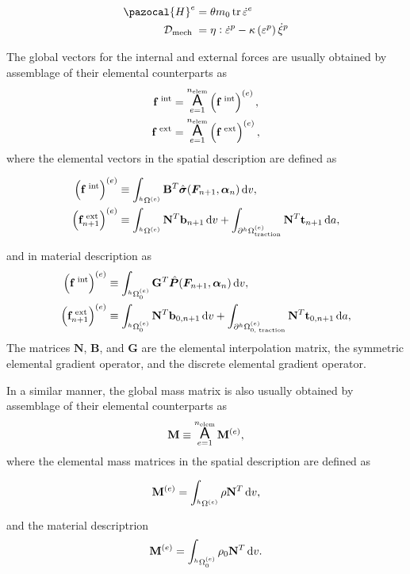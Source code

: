 \begin{equation}
\begin{aligned}
\pazocal{H}^{e} &=\theta m_{0} \operatorname{tr} \dot{\varepsilon}^{e} \\
\mathcal{D}_{\text {mech }} &=\eta: \dot{\varepsilon}^{p}-\kappa\left(\varepsilon^{p}\right) \dot{\xi}^{p}
\end{aligned}
\end{equation}


The global vectors for the internal and external forces are usually obtained by assemblage of their elemental counterparts as
\begin{gather}
    \mathbf f^\text{\;int} = \operatorname*{\text{\Large $ \mathsf{A} $}}_{e=1}^{n_\text{elem}} \left(\mathbf f^\text{\;int}\right)^{(e)},\\
    \mathbf f^\text{\;ext} = \operatorname*{\text{\Large $ \mathsf{A} $}}_{e=1}^{n_\text{elem}} \left(\mathbf f^\text{\;ext}\right)^{(e)},
\end{gather}
where the elemental vectors in the spatial description are defined as
\begin{highlight}[innertopmargin=-5pt]
    \begin{align}
        \left(\mathbf f^\text{\;int}\right)^{(e)} &\equiv \int_{^h\Omega^{(e)}} \mathbf B^T \hat{\bm{\sigma} }(\bm{F}_{n+1},\bm{\alpha}_n)\,\mathrm{d} v,\\
        \left(\mathbf f^\text{\;ext}_{n+1}\right)^{(e)} &\equiv \int_{^h\Omega^{(e)}}\mathbf N^T \mathbf b_{n+1}\,\mathrm{d} v + \int_{\partial^h\Omega_\text{traction}^{(e)}} \mathbf N^T \mathbf t_{n+1}\,\mathrm{d} a,
    \end{align}
\end{highlight}
and in material description as
    \begin{align}
        \left(\mathbf f^\text{\;int}\right)^{(e)} &\equiv \int_{^h\Omega_0^{(e)}} \mathbf G^T \hat{\bm{P} }(\bm{F}_{n+1},\bm{\alpha}_n)\,\mathrm{d} v,\\
        \left(\mathbf f^\text{\;ext}_{n+1}\right)^{(e)} &\equiv \int_{^h\Omega_0^{(e)}}\mathbf N^T \mathbf b_{0,n+1}\,\mathrm{d} v + \int_{\partial^h\Omega_\text{0, traction}^{(e)}} \mathbf N^T \mathbf t_{0,n+1}\,\mathrm{d} a,
    \end{align}
The matrices $\mathbf N$, $\mathbf B$, and $\mathbf G$ are the elemental interpolation matrix, the symmetric elemental gradient operator, and the discrete elemental gradient operator.

In a similar manner, the global mass matrix is also usually obtained by assemblage of their elemental counterparts as
\begin{equation}
  \mathbf M \equiv \operatorname*{\text{\Large $ \mathsf{A} $}}_{e=1}^{n_\text{elem}} \mathbf M^{(e)},
\end{equation}
where the elemental mass matrices in the spatial description are defined as
\begin{highlight}
  \begin{equation}
    \mathbf M^{(e)} = \int_{^h\Omega^{(e)}} \rho \mathbf N^T\,\mathrm{d} v,
  \end{equation}
\end{highlight}
and the material descriptrion
\begin{equation}
  \mathbf M^{(e)} = \int_{^h\Omega_0^{(e)}} \rho_0\mathbf N^T \,\mathrm{d} v.
\end{equation}

